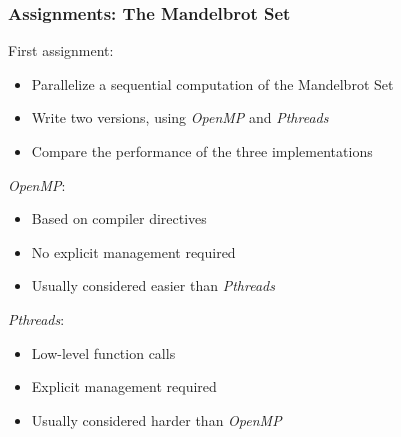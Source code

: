 \documentclass[10pt, compress, aspectratio=169]{beamer}
\begin{document}
\begin{frame}
    \frametitle{Assignments: The Mandelbrot Set}
    First assignment:

    \begin{itemize}
        \item Parallelize a sequential computation of the Mandelbrot Set
        \item Write two versions, using \textit{OpenMP} and \textit{Pthreads}
        \item Compare the performance of the three implementations
    \end{itemize}

    \pause

    \textit{OpenMP}:
    \begin{itemize}
        \item Based on compiler directives
        \item No explicit management required
        \item Usually considered easier than \textit{Pthreads}
    \end{itemize}

    \pause

    \textit{Pthreads}:
    \begin{itemize}
        \item Low-level function calls
        \item Explicit management required
        \item Usually considered harder than \textit{OpenMP}
    \end{itemize}
\end{frame}
\end{document}

